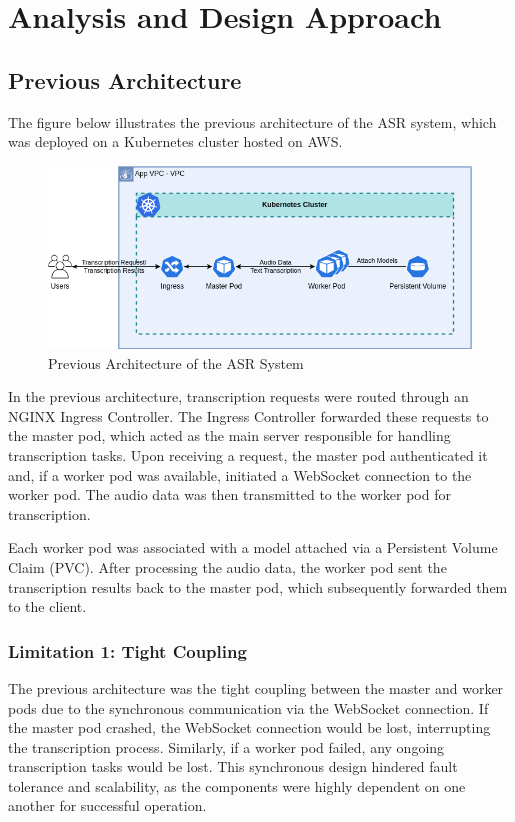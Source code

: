 \chapter{Analysis and Design Approach} \label{chapter:analysis_and_design}
\section{Previous Architecture}
The figure below illustrates the previous architecture of the ASR system, which was deployed on a Kubernetes cluster hosted on AWS.

\begin{figure}[!ht]
    \centering
    \includegraphics[width=\textwidth]{figures/previous_architecture.drawio.png}
    \caption{Previous Architecture of the ASR System}
\end{figure}

In the previous architecture, transcription requests were routed through an NGINX Ingress Controller. The Ingress Controller forwarded these requests to the master pod, which acted as the main server responsible for handling transcription tasks. Upon receiving a request, the master pod authenticated it and, if a worker pod was available, initiated a WebSocket connection to the worker pod. The audio data was then transmitted to the worker pod for transcription.

Each worker pod was associated with a model attached via a Persistent Volume Claim (PVC). After processing the audio data, the worker pod sent the transcription results back to the master pod, which subsequently forwarded them to the client.

\subsection{Limitation 1: Tight Coupling}
The previous architecture was the tight coupling between the master and worker pods due to the synchronous communication via the WebSocket connection. If the master pod crashed, the WebSocket connection would be lost, interrupting the transcription process. Similarly, if a worker pod failed, any ongoing transcription tasks would be lost. This synchronous design hindered fault tolerance and scalability, as the components were highly dependent on one another for successful operation.

